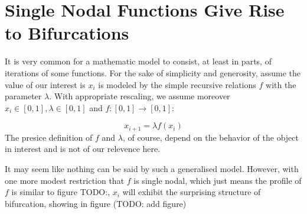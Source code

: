 \documentclass{report}
\theoremstyle{definition}
\theoremstyle{definition}
\theoremstyle{remark}
\begin{document}
\section{Single Nodal Functions Give Rise to Bifurcations}

It is very common for a mathematic model to consist, at least in parts, of iterations of some functions.
For the sake of simplicity and generosity, assume the value of our interest is $x_i$ is modeled by the simple recursive relations $f$ with the parameter $\lambda$. With appropriate rescaling, we assume moreover $x_i \in [0,1], \lambda \in [0,1]$ and $f: [0,1] \rightarrow [0,1]$:

\begin{equation}
	x_{i+1}=\lambda f(x_i)
\end{equation}
The presice definition of $f$ and $\lambda$, of course, depend on the behavior of the object in interest and is not of our relevence here.

It may seem like nothing can be said by such a generalised model. However, with one more modest restriction that $f$ is single nodal, which just means the profile of $f$ is similar to figure TODO:, $x_i$ will exhibit the surprising structure of bifurcation, showing in figure (TODO: add figure)
\end{document}
